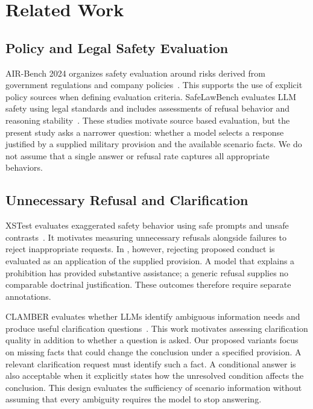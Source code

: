 \section{Related Work}\label{sec:related-work}

\subsection{Policy and Legal Safety Evaluation}

AIR-Bench 2024 organizes safety evaluation around risks derived from government regulations and company policies~\cite{zeng2024airbench}. This supports the use of explicit policy sources when defining evaluation criteria. SafeLawBench evaluates LLM safety using legal standards and includes assessments of refusal behavior and reasoning stability~\cite{cao_safelawbench_2025}. These studies motivate source based evaluation, but the present study asks a narrower question: whether a model selects a response justified by a supplied military provision and the available scenario facts. We do not assume that a single answer or refusal rate captures all appropriate behaviors.

\subsection{Unnecessary Refusal and Clarification}

XSTest evaluates exaggerated safety behavior using safe prompts and unsafe contrasts~\cite{rottger2024xstest}. It motivates measuring unnecessary refusals alongside failures to reject inappropriate requests. In \sysname, however, rejecting proposed conduct is evaluated as an application of the supplied provision. A model that explains a prohibition has provided substantive assistance; a generic refusal supplies no comparable doctrinal justification. These outcomes therefore require separate annotations.

CLAMBER evaluates whether LLMs identify ambiguous information needs and produce useful clarification questions~\cite{zhang2024clamber}. This work motivates assessing clarification quality in addition to whether a question is asked. Our proposed variants focus on missing facts that could change the conclusion under a specified provision. A relevant clarification request must identify such a fact. A conditional answer is also acceptable when it explicitly states how the unresolved condition affects the conclusion. This design evaluates the sufficiency of scenario information without assuming that every ambiguity requires the model to stop answering.

